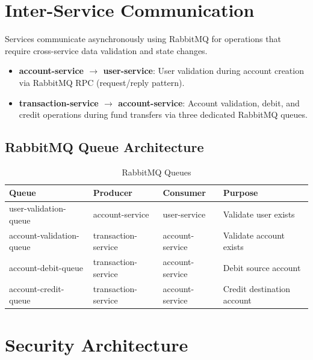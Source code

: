 \documentclass[12pt,a4paper]{report}
\begin{document}
\section{Inter-Service Communication}
Services communicate asynchronously using RabbitMQ for operations that require cross-service data validation and state changes.

\begin{infobox}
\begin{itemize}[leftmargin=*]
    \item \textbf{account-service $\rightarrow$ user-service}: User validation during account creation via RabbitMQ RPC (request/reply pattern).
    \item \textbf{transaction-service $\rightarrow$ account-service}: Account validation, debit, and credit operations during fund transfers via three dedicated RabbitMQ queues.
\end{itemize}
\end{infobox}

\subsection{RabbitMQ Queue Architecture}

\begin{table}[H]
\centering
\caption{RabbitMQ Queues}
\begin{tabularx}{\textwidth}{lllX}
\toprule
\textbf{Queue} & \textbf{Producer} & \textbf{Consumer} & \textbf{Purpose} \\
\midrule
user-validation-queue & account-service & user-service & Validate user exists \\
account-validation-queue & transaction-service & account-service & Validate account exists \\
account-debit-queue & transaction-service & account-service & Debit source account \\
account-credit-queue & transaction-service & account-service & Credit destination account \\
\bottomrule
\end{tabularx}
\end{table}

\section{Security Architecture}
\end{document}
